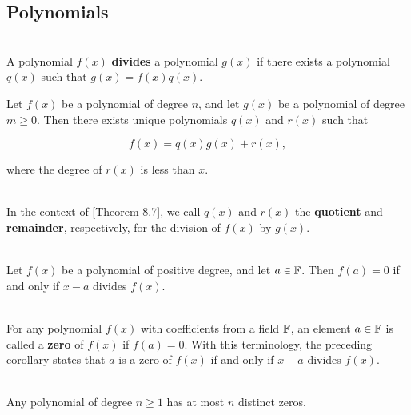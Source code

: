\begin{alphasection}
	\setcounter{alphasect}{4}
	\section{Polynomials}

	\begin{definition}
		\hfill\\
		A polynomial $f(x)$ \textbf{divides} a polynomial $g(x)$ if there exists a polynomial $q(x)$ such that $g(x) = f(x)q(x)$.
	\end{definition}

	\begin{theorem}\label{Theorem 8.7}
		Let $f(x)$ be a polynomial of degree $n$, and let $g(x)$ be a polynomial of degree $m \geq 0$. Then there exists unique polynomials $q(x)$ and $r(x)$ such that

		\[f(x) = q(x)g(x)+r(x),\]

		where the degree of $r(x)$ is less than $x$.
	\end{theorem}

	\begin{definition}
		\hfill\\
		In the context of \autoref{Theorem 8.7}, we call $q(x)$ and $r(x)$ the \textbf{quotient} and \textbf{remainder}, respectively, for the division of $f(x)$ by $g(x)$.
	\end{definition}

	\begin{corollary}
		\hfill\\
		Let $f(x)$ be a polynomial of positive degree, and let $a \in \mathbb{F}$. Then $f(a) = 0$ if and only if $x-a$ divides $f(x)$.
	\end{corollary}

	\begin{definition}
		\hfill\\
		For any polynomial $f(x)$ with coefficients from a field $\mathbb{F}$, an element $a \in \mathbb{F}$ is called a \textbf{zero} of $f(x)$ if $f(a) =0$. With this terminology, the preceding corollary states that $a$ is a zero of $f(x)$ if and only if $x-a$ divides $f(x)$.
	\end{definition}

	\begin{corollary}
		\hfill\\
		Any polynomial of degree $n \geq 1$ has at most $n$ distinct zeros.
	\end{corollary}


\end{alphasection}
